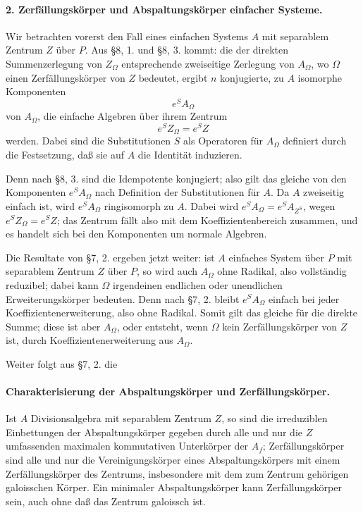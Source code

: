 \documentclass[11pt]{article}
\begin{document}
\paragraph{2. Zerfällungskörper und Abspaltungskörper einfacher Systeme.}
Wir betrachten vorerst den Fall eines einfachen Systems \(A\) mit separablem Zentrum \(Z\) über \(P\). Aus §8, 1. und §8, 3. kommt: die der direkten Summenzerlegung von \(Z_\Omega\) entsprechende zweiseitige Zerlegung von \(A_\Omega\), wo \(\Omega\) einen Zerfällungskörper von \(Z\) bedeutet, ergibt \(n\) konjugierte, zu \(A\) isomorphe Komponenten
\[
        e^S A_\Omega
\]
von \(A_\Omega\), die einfache Algebren über ihrem Zentrum
\[
        e^S Z_\Omega=e^S Z
\]
werden. Dabei sind die Substitutionen \(S\) als Operatoren für \(A_\Omega\) definiert durch die Festsetzung, daß sie auf \(A\) die Identität induzieren.

Denn nach §8, 3. sind die Idempotente konjugiert; also gilt das gleiche von den Komponenten \(e^S A_\Omega\) nach Definition der Substitutionen für \(A\). Da \(A\) zweiseitig einfach ist, wird \(e^S A_\Omega\) ringisomorph zu \(A\). Dabei wird \(e^SA_\Omega=e^S A_{Z^{S}}\), wegen \(e^S Z_\Omega=e^S Z\); das Zentrum fällt also mit dem Koeffizientenbereich zusammen, und es handelt sich bei den Komponenten um normale Algebren.

Die Resultate von §7, 2. ergeben jetzt weiter: ist \(A\) einfaches System über \(P\) mit separablem Zentrum \(Z\) über \(P\), so wird auch \(A_\Omega\) ohne Radikal, also vollständig reduzibel; dabei kann \(\Omega\) irgendeinen endlichen oder unendlichen Erweiterungskörper bedeuten. Denn nach §7, 2. bleibt \(e^S A_\Omega\) einfach bei jeder Koeffizientenerweiterung, also ohne Radikal. Somit gilt das gleiche für die direkte Summe; diese ist aber \(A_\Omega\), oder entsteht, wenn \(\Omega\) kein Zerfällungskörper von \(Z\) ist, durch Koeffizientenerweiterung aus \(A_\Omega\).

Weiter folgt aus §7, 2. die

\paragraph{Charakterisierung der Abspaltungskörper und Zerfällungskörper.}
Ist \(A\) Divisionsalgebra mit separablem Zentrum \(Z\), so sind die irreduziblen Einbettungen der Abspaltungskörper gegeben durch alle und nur die \(Z\) umfassenden maximalen kommutativen Unterkörper der \(A_f\); Zerfällungskörper sind alle und nur die Vereinigungskörper eines Abspaltungskörpers mit einem Zerfällungskörper des Zentrums, insbesondere mit dem zum Zentrum gehörigen galoisschen Körper. Ein minimaler Abspaltungskörper kann Zerfällungskörper sein, auch ohne daß das Zentrum galoissch ist.
\end{document}
